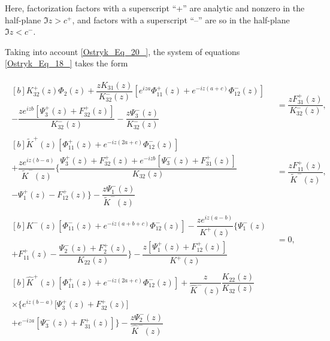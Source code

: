 Here, factorization factors with a superscript ``+'' are analytic and nonzero in the half-plane $\Im z>c^{+} $, and factors with a superscript ``--'' are so in the half-plane $\Im z<c^{-} $.

Taking into account \eqref{Ostryk_Eq_20_}, the system of equations \eqref{Ostryk_Eq_18_} takes the form

\begin{equation} \label{Ostryk_Eq_21_} 
\begin{aligned}
	\begin{multlined}[b]
		K_{32}^{+} (z)\Phi _{2} (z)+\dfrac{zK_{31} (z)}{K_{32}^{-} (z)} \left[e^{iza} \Phi _{11}^{+} (z)+e^{-iz(a+c)} \Phi _{12}^{-} (z)\right]
		\\
		-\dfrac{ze^{izb} \left[\Psi _{3}^{+} (z)+F_{32}^{+} (z)\right]}{K_{32}^{-} (z)} -\dfrac{z\Psi _{3}^{-} (z)}{K_{32}^{-} (z)} 
	\end{multlined}  &= \dfrac{zF_{31}^{+} (z)}{K_{32}^{-} (z)} ,
	\\ 
	\begin{multlined}[b]
		\tilde{K}^{+} (z)\left[\Phi _{11}^{+} (z)+e^{-iz(2a+c)} \Phi _{12}^{-} (z)\right]
		\\
		+\dfrac{ze^{iz(b-a)} }{\tilde{K}^{-} (z)} \Bigg\{ \dfrac{\Psi _{3}^{+} (z)+F_{32}^{+} (z)+e^{-izb} \left[\Psi _{3}^{-} (z)+F_{31}^{+} (z)\right] }{K_{32} (z)}  
		\\
		-\Psi _{1}^{+} (z)-F_{12}^{+} (z)\Bigg\} -\dfrac{z\Psi _{1}^{-} (z)}{\tilde{K}^{-} (z)}
	\end{multlined} &= \dfrac{zF_{11}^{+} (z)}{\tilde{K}^{-} (z)} ,
	\\
	\begin{multlined}[b]
		K^{-} (z)\left[\Phi _{11}^{-} (z)+e^{-iz(a+b+c)} \Phi _{12}^{-} (z)\right]-\dfrac{ze^{iz(a-b)} }{K^{+} (z)} \Bigg\{\Psi _{1}^{-} (z)
		\\
		+F_{11}^{+} (z) -\dfrac{\Psi _{2}^{-} (z)+F_{2}^{+} (z)}{K_{22} (z)} \Bigg\}-\dfrac{z\left[\Psi _{1}^{+} (z)+F_{12}^{+} (z)\right] }{K^{+} (z)} 
	\end{multlined}&=0,
	\\
	\begin{multlined}[b]
		\hat{K}^{+} (z)\left[\Phi _{11}^{+} (z)+e^{-iz(2a+c)} \Phi _{12}^{-} (z)\right]+\dfrac{z}{\hat{K}^{-} (z)} \dfrac{K_{22} (z)}{K_{32} (z)} 
		\\
		\times\Big\{e^{iz(b-a)} \big[\Psi _{3}^{+} (z) +F_{32}^{+} (z)\big]
		\\
		+e^{-iza} \left[\Psi _{3}^{-} (z)+F_{31}^{+} (z)\right]\Big\}-\dfrac{z\Psi _{2}^{-} (z)}{\hat{K}^{-} (z)} 

\end{multlined}
\end{aligned}
\end{equation}
